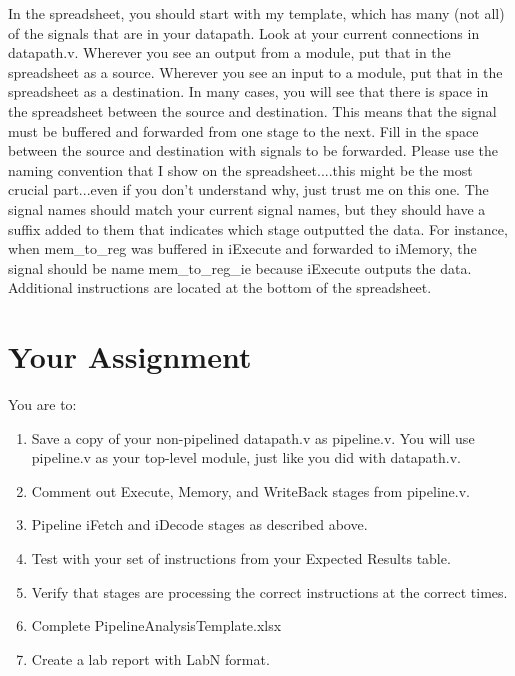 In the spreadsheet, you should start with my template, which has many (not all) of the signals that are in your datapath.  Look at your current connections in datapath.v.  Wherever you see an output from a module, put that in the spreadsheet as a source.  Wherever you see an input to a module, put that in the spreadsheet as a destination.  In many cases, you will see that there is space in the spreadsheet between the source and destination.  This means that the signal must be buffered and forwarded from one stage to the next.  Fill in the space between the source and destination with signals to be forwarded.  Please use the naming convention that I show on the spreadsheet....this might be the most crucial part...even if you don't understand why, just trust me on this one.  The signal names should match your current signal names, but they should have a suffix added to them that indicates which stage outputted the data.  For instance, when mem\_to\_reg was buffered in iExecute and forwarded to iMemory, the signal should be name mem\_to\_reg\_ie because iExecute outputs the data. Additional instructions are located at the bottom of the spreadsheet.


\section{Your Assignment}

You are to:
\begin{enumerate}
\item Save a copy of your non-pipelined datapath.v as pipeline.v.  You will use pipeline.v as your top-level module, just like you did with datapath.v.
\item Comment out Execute, Memory, and WriteBack stages from pipeline.v.
\item Pipeline iFetch and iDecode stages as described above.   
\item Test with your set of instructions from your Expected Results table.
\item Verify that stages are processing the correct instructions at the correct times.
\item Complete PipelineAnalysisTemplate.xlsx
\item Create a lab report with LabN format.
\end{enumerate} 